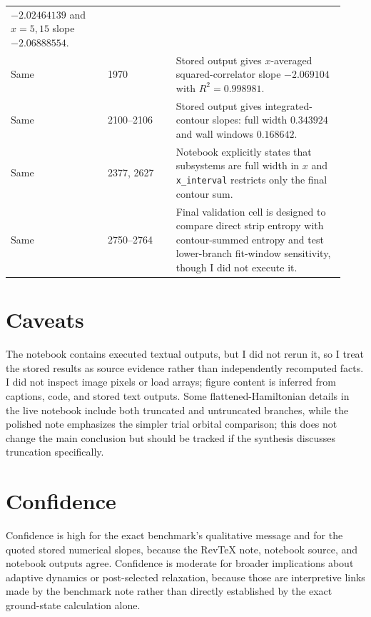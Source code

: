 \documentclass[aps,prb,onecolumn,nofootinbib,superscriptaddress]{revtex4-2}
\begin{document}
\begin{ruledtabular}
\begin{tabular}{p{0.27\linewidth}p{0.19\linewidth}p{0.47\linewidth}}
$-2.02464139$ and $x=5,15$ slope $-2.06888554$. \\
Same & 1970
& Stored output gives $x$-averaged squared-correlator slope $-2.069104$ with
$R^2=0.998981$. \\
Same & 2100--2106
& Stored output gives integrated-contour slopes: full width $0.343924$ and
wall windows $0.168642$. \\
Same & 2377, 2627
& Notebook explicitly states that subsystems are full width in $x$ and
\texttt{x\_interval} restricts only the final contour sum. \\
Same & 2750--2764
& Final validation cell is designed to compare direct strip entropy with
contour-summed entropy and test lower-branch fit-window sensitivity, though I
did not execute it. \\
\end{tabular}
\end{ruledtabular}

\section{Caveats}
The notebook contains executed textual outputs, but I did not rerun it, so I
treat the stored results as source evidence rather than independently
recomputed facts.  I did not inspect image pixels or load arrays; figure
content is inferred from captions, code, and stored text outputs.  Some
flattened-Hamiltonian details in the live notebook include both truncated and
untruncated branches, while the polished note emphasizes the simpler trial
orbital comparison; this does not change the main conclusion but should be
tracked if the synthesis discusses truncation specifically.

\section{Confidence}
Confidence is high for the exact benchmark's qualitative message and for the
quoted stored numerical slopes, because the RevTeX note, notebook source, and
notebook outputs agree.  Confidence is moderate for broader implications about
adaptive dynamics or post-selected relaxation, because those are interpretive
links made by the benchmark note rather than directly established by the exact
ground-state calculation alone.
\end{document}
